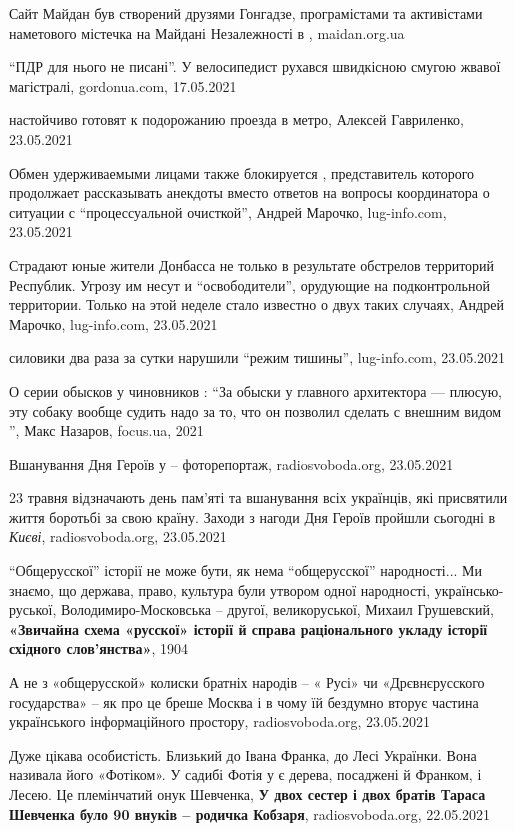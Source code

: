 Сайт Майдан був створений друзями Гонгадзе, програмістами та активістами
наметового містечка на Майдані Незалежності в , maidan.org.ua

\enquote{ПДР для нього не писані}. У  велосипедист рухався
швидкісною смугою жвавої магістралі, gordonua.com, 17.05.2021

 настойчиво готовят к подорожанию проезда в метро, Алексей
Гавриленко, 23.05.2021

Обмен удерживаемыми лицами также блокируется , представитель
которого продолжает рассказывать анекдоты вместо ответов на вопросы
координатора о ситуации с \enquote{процессуальной очисткой}, Андрей Марочко,
lug-info.com, 23.05.2021

Страдают юные жители Донбасса не только в результате обстрелов территорий
Республик. Угрозу им несут и \enquote{освободители}, орудующие на
подконтрольной  территории. Только на этой неделе стало известно о
двух таких случаях, Андрей Марочко, lug-info.com, 23.05.2021

 силовики два раза за сутки нарушили \enquote{режим тишины},
lug-info.com, 23.05.2021

О серии обысков у чиновников : ``За обыски у главного архитектора —
плюсую, эту собаку вообще судить надо за то, что он позволил сделать с внешним
видом '', Макс Назаров, focus.ua, 2021

Вшанування Дня Героїв у  – фоторепортаж, radiosvoboda.org, 23.05.2021

23 травня відзначають день пам'яті та вшанування всіх українців, які присвятили
життя боротьбі за свою країну. Заходи з нагоди Дня Героїв пройшли сьогодні в
\emph{Києві}, radiosvoboda.org, 23.05.2021

\enquote{Общерусскої} історії не може бути, як нема \enquote{общерусскої}
народності... Ми знаємо, що  держава, право, культура були утвором
одної народності, українсько-руської, Володимиро-Московська – другої,
великоруської, Михаил Грушевский, \textbf{«Звичайна схема «русскої» історії й справа
раціонального укладу історії східного слов'янства»}, 1904

А не з «общерусской» колиски братніх народів – « Русі» чи
«Дрєвнєрусского государства» – як про це бреше Москва і в чому їй бездумно
вторує частина українського інформаційного простору, radiosvoboda.org,
23.05.2021

Дуже цікава особистість. Близький до Івана Франка, до Лесі Українки. Вона
називала його «Фотіком». У садибі Фотія у  є дерева, посаджені й
Франком, і Лесею. Це племінчатий онук Шевченка, \textbf{У двох сестер і двох братів
Тараса Шевченка було 90 внуків – родичка Кобзаря}, radiosvoboda.org, 22.05.2021 


